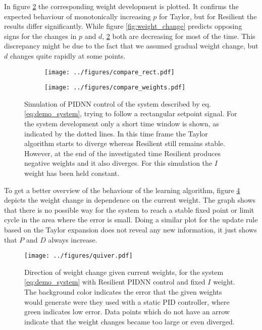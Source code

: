 \documentclass{article}
\begin{document}
    In figure \ref{subfig:sim:weights} the corresponding weight development is plotted. It confirms the expected behaviour 
    of monotonically increasing $p$ for Taylor, but for Resilient the results differ significantly. While figure 
    \ref{fig:weight_change} predicts opposing signs for the changes in $p$ and $d$, \ref{subfig:sim:weights} both are 
    decreasing for most of the time. This discrepancy might be due to the fact that we assumed gradual weight change, 
    but $d$ changes quite rapidly at some points.
    \begin{figure}[htb]
    \begin{subfigure}[c]{0.5\textwidth}
        \texttt{[image: ../figures/compare\_rect.pdf]}
        \label{subfig:sim:control}
    \end{subfigure}
    \begin{subfigure}[c]{0.5\textwidth}
        \texttt{[image: ../figures/compare\_weights.pdf]}
        \label{subfig:sim:weights}
    \end{subfigure}
    \caption{Simulation of PIDNN control of the system described by eq. \eqref{eq:demo_system}, 
             trying to follow a rectangular setpoint signal. For the system development only a short
              time window is shown, as indicated by the dotted lines.
             In this time frame the Taylor algorithm starts to diverge whereas Resilient still
             remains stable. However, at the end of the investigated time Resilient produces
             negative weights and it also diverges. For this simulation the $I$ weight has been held 
             constant.}
    \label{fig:weights}
    \end{figure}

    To get a better overview of the behaviour of the learning algorithm, figure \ref{fig:quiver} 
    depicts the weight change in dependence on the current weight.
    The graph shows that there is no possible way for the system to reach a stable fixed point or 
    limit cycle in the area where the error is small. 
    Doing a similar plot for the update rule based on the Taylor expansion
    does not reveal any new information, it just shows that $P$ and $D$ always increase.

    \begin{figure}[tb]
        \centering
        \texttt{[image: ../figures/quiver.pdf]}
        \caption{Direction of weight change given current weights, for the system 
        \eqref{eq:demo_system} with Resilient PIDNN control and fixed $I$ weight. 
        The background color indicates the error that the given weights would generate were they 
        used with a static PID controller, where green indicates low error. 
        Data points which do not have an arrow indicate that the weight changes became too large 
        or even diverged.}
        \label{fig:quiver}
    \end{figure}
\end{document}

